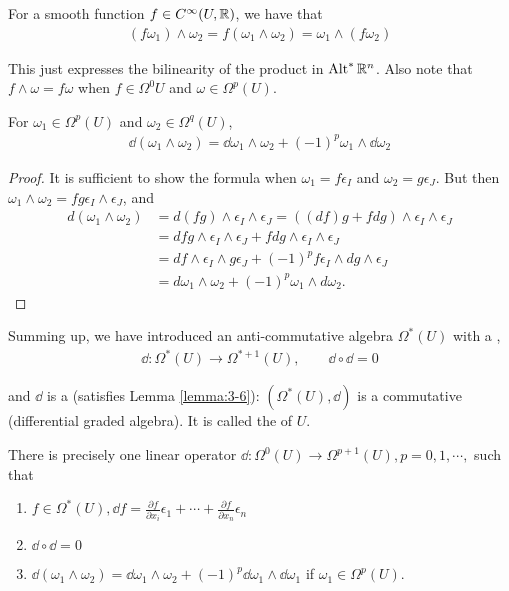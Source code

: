 For a smooth function $f\in C^\infty(U, \mathbb{R})$, we have that
\begin{align*}
  (f\omega_1)\wedge\omega_2 = f(\omega_1\wedge\omega_2) = \omega_1\wedge(f\omega_2)
\end{align*}

This just expresses the bilinearity of the product in $\operatorname{Alt}^{*}\mathbb{R}^n$. Also note that 
$f\wedge\omega = f\omega$ when $f\in\Omega^0{U}$ and $\omega\in\Omega^p(U)$.

\begin{lemma}\label{lemma:3-6}
For $\omega_1\in\Omega^p(U)$ and $\omega_2\in\Omega^q(U)$,
\begin{align*}
  \dd(\omega_1\wedge\omega_2) = \dd\omega_1\wedge\omega_2 + (-1)^p\omega_1\wedge\dd\omega_2
\end{align*}
\end{lemma}

\begin{proof}
  It is sufficient to show the formula when $\omega_1=f\epsilon_I$ and $\omega_2=g\epsilon_J$. But 
  then $\omega_1\wedge\omega_2 = fg\epsilon_I\wedge\epsilon_J$, and 
  \begin{align*}
    d(\omega_1\wedge\omega_2) 
    & = d(fg)\wedge\epsilon_{I}\wedge\epsilon_{J}=((df)g+fdg)\wedge\epsilon_{I}\wedge\epsilon_{J} \\
    & = dfg\wedge\epsilon_{I}\wedge\epsilon_{J}+fdg\wedge\epsilon_{I}\wedge\epsilon_{J} \\
    & = df\wedge\epsilon_{I}\wedge g\epsilon_{J}+(-1)^{p}f\epsilon_{I}\wedge dg\wedge\epsilon_{J} \\
    & = d\omega_{1}\wedge\omega_{2}+(-1)^{p}\omega_{1}\wedge d\omega_{2}. 
  \end{align*}
\end{proof}

Summing up, we have introduced an anti-commutative algebra $\Omega^*(U)$ with a ,
\begin{align*}
  \dd:\Omega^*(U)\to\Omega^{*+1}(U), \qquad \dd\circ\dd = 0
\end{align*}

and $\dd$ is a  (satisfies Lemma \ref{lemma:3-6}): $(\Omega^*(U), \dd)$ is a commutative 
(differential graded algebra). It is called the  of $U$.

\begin{theorem}\label{theorem:3-7}
There is precisely one linear operator $\dd:\Omega^0(U)\to\Omega^{p+1}(U), p = 0,1, \cdots,$ such that  
\begin{enumerate}[label=(\roman*)]
  \item $f\in\Omega^*(U), \dd f = \frac{\partial f }{\partial x_i }\epsilon_1 + \cdots + \frac{\partial f}{\partial x_n}\epsilon_n$
  \item $\dd\circ\dd = 0$
  \item $\dd(\omega_1\wedge\omega_2) = \dd\omega_1\wedge\omega_2 + (-1)^p\dd\omega_1\wedge\dd\omega_1$ if $\omega_1\in\Omega^p(U)$.
\end{enumerate}
\end{theorem}

